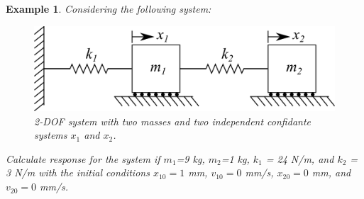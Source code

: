 \documentclass[12pt,letter]{article}
\newtheorem{ex}{Example}
\numberwithin{ex}{section} %
\newenvironment{example}{\begin{mdframed}[middlelinewidth=0.5mm]\begin{ex}\normalfont}{\end{ex}\end{mdframed}}
\numberwithin{re}{section} %
\begin{document}
\begin{example}
\label{ex:2-DOF}
Considering the following system:
\begin{figure}[H]
	\centering
	\includegraphics[]{../Figures/2-DOF-spring_mass_horizontal.png}
	\caption{2-DOF system with two masses and two independent confidante systems $x_1$ and $x_2$.}
\end{figure}
Calculate response for the system if $m_1$=9 kg, $m_2$=1 kg, $k_1$ = 24 N/m, and $k_2$ = 3 N/m with the initial conditions $x_{10}=1$ mm, $v_{10}=0$ mm/s, $x_{20}=0$ mm, and $v_{20}=0$ mm/s. \\



\end{example}
\end{document}
